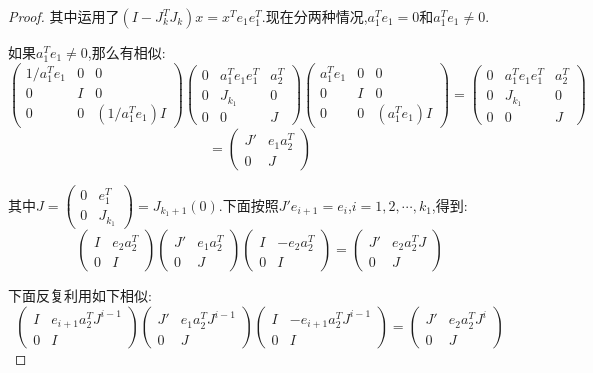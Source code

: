 \begin{proof}
	其中运用了$(I-J_k^TJ_k)x=x^Te_1e_1^T$.现在分两种情况,$a_1^Te_1=0$和$a_1^Te_1\not=0$.
	
	如果$a_1^Te_1\not=0$,那么有相似:
	$$\left(\begin{array}{ccc}
	1/a_1^Te_1&0&0\\
	0&I&0\\
	0&0&(1/a_1^Te_1)I
	\end{array}\right)\left(\begin{array}{ccc}
	0&a_1^Te_1e_1^T&a_2^T\\
	0&J_{k_1}&0\\
	0&0&J
	\end{array}\right)\left(\begin{array}{ccc}
	a_1^Te_1&0&0\\
	0&I&0\\
	0&0&(a_1^Te_1)I
	\end{array}\right)=\left(\begin{array}{ccc}
	0&a_1^Te_1e_1^T&a_2^T\\
	0&J_{k_1}&0\\
	0&0&J
	\end{array}\right)$$
	$$=\left(\begin{array}{cc}
	J'&e_1a_2^T\\
	0&J
	\end{array}\right)$$
	
	其中$J=\left(\begin{array}{cc}
	0&e_1^T\\
	0&J_{k_1}
	\end{array}\right)=J_{k_1+1}(0)$.下面按照$J'e_{i+1}=e_i$,$i=1,2,\cdots,k_1$,得到:
	$$\left(\begin{array}{cc}
	I&e_2a_2^T\\
	0&I
	\end{array}\right)\left(\begin{array}{cc}
	J'&e_1a_2^T\\
	0&J
	\end{array}\right)\left(\begin{array}{cc}
	I&-e_2a_2^T\\
	0&I
	\end{array}\right)=\left(\begin{array}{cc}
	J'&e_2a_2^TJ\\
	0&J
	\end{array}\right)$$
	
	下面反复利用如下相似:
	$$\left(\begin{array}{cc}
	I&e_{i+1}a_2^TJ^{i-1}\\
	0&I
	\end{array}\right)\left(\begin{array}{cc}
	J'&e_1a_2^TJ^{i-1}\\
	0&J
	\end{array}\right)\left(\begin{array}{cc}
	I&-e_{i+1}a_2^TJ^{i-1}\\
	0&I
	\end{array}\right)=\left(\begin{array}{cc}
	J'&e_2a_2^TJ^i\\
	0&J
	\end{array}\right)$$
	

\end{proof}
